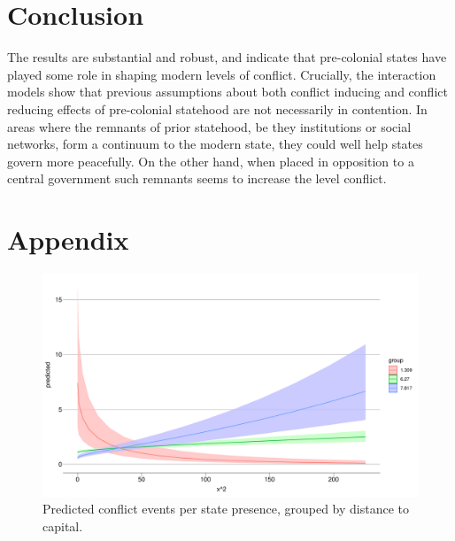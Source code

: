 \documentclass[12pt]{article}
\begin{document}


\section{Conclusion}

The results are substantial  and robust, and indicate that pre-colonial states
have played some role in shaping modern levels of conflict. Crucially, the
interaction models show that previous assumptions about both conflict inducing
and conflict reducing effects of pre-colonial statehood are not necessarily in
contention. In areas where the remnants of prior statehood, be they institutions
or social networks, form a continuum to the modern state, they could well help
states govern more peacefully. On the other hand, when placed in opposition to a
central government such remnants seems to increase the level conflict.


\pagebreak




\pagebreak
\section*{Appendix}






\begin{figure}[htpb]
	\centering
	\includegraphics[width=\linewidth]{"../R/Output/ggStatePlot.pdf"}
	\caption{Predicted conflict events per state presence, grouped by
	distance to capital.}
	\label{state_int}
\end{figure}
\end{document}
